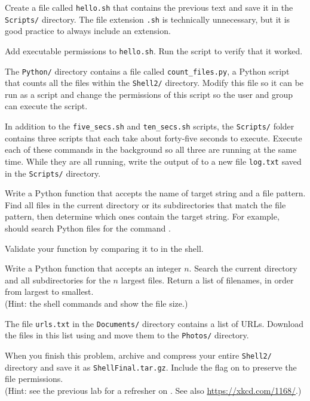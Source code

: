 
Create a file called \texttt{hello.sh} that contains the previous text and save it in the \texttt{Scripts/} directory.
The file extension \texttt{.sh} is technically unnecessary, but it is good practice to always include an extension.

Add executable permissions to \texttt{hello.sh}.
Run the script to verify that it worked.

The \texttt{Python/} directory contains a file called \texttt{count\_files.py}, a Python script that counts all the files within the \texttt{Shell2/} directory.
Modify this file so it can be run as a script and change the permissions of this script so the user and group can execute the script.

In addition to the \texttt{five\_secs.sh} and \texttt{ten\_secs.sh} scripts, the \texttt{Scripts/} folder contains three scripts that each take about forty-five seconds to execute.
Execute each of these commands in the background so all three are running at the same time.
While they are all running, write the output of  to a new file \texttt{log.txt} saved in the \texttt{Scripts/} directory.

Write a Python function  that accepts the name of target string and a file pattern.
Find all files in the current directory or its subdirectories that match the file pattern, then determine which ones contain the target string.
For example,  should search Python files for the command .

Validate your function by comparing it to  in the shell.

Write a Python function that accepts an integer $n$.
Search the current directory and all subdirectories for the $n$ largest files.
Return a list of filenames, in order from largest to smallest.
\\(Hint: the shell commands  and  show the file size.)

The file \texttt{urls.txt} in the \texttt{Documents/} directory contains a list of URLs.
Download the files in this list using  and move them to the \texttt{Photos/} directory.

When you finish this problem, archive and compress your entire \texttt{Shell2/} directory and save it as \texttt{ShellFinal.tar.gz}.
Include the  flag on  to preserve the file permissions.
\\(Hint: see the previous lab for a refresher on .
See also \url{https://xkcd.com/1168/}.)

